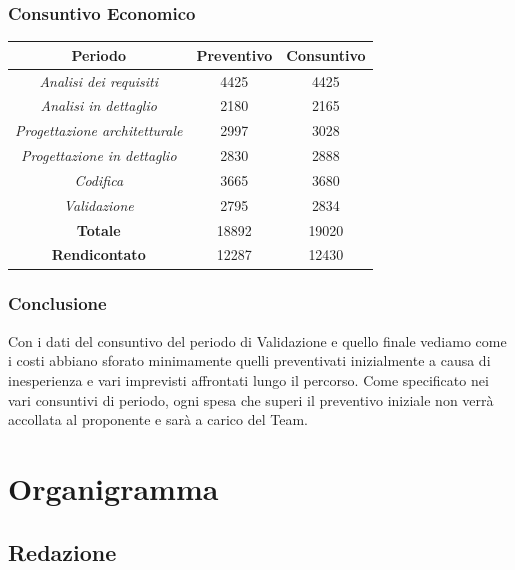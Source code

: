 \subsubsection{Consuntivo Economico}

\begin{center}
	\centering
	\begin{tabular}{|c|c|c|}
		\hline
		\textbf{Periodo} & \textbf{Preventivo} & \textbf{Consuntivo} \\
		\hline	\emph{Analisi dei requisiti}  &4425  &4425 \\
		\hline  \emph{Analisi in dettaglio}  &2180  &2165  \\
		\hline  \emph{Progettazione architetturale}  &2997  &3028  \\
		\hline  \emph{Progettazione in dettaglio}  &2830  &2888  \\
		\hline  \emph{Codifica}  &3665  &3680  \\
		\hline  \emph{Validazione}  &2795  &2834  \\
		\hline
		\textbf{Totale} &18892  &19020  \\
		\hline
		\textbf{Rendicontato} &12287  &12430  \\
		\hline
	\end{tabular}
	
\end{center}

\subsubsection{Conclusione}
Con i dati del consuntivo del periodo di Validazione e quello finale vediamo come i costi abbiano sforato minimamente quelli preventivati inizialmente a causa di inesperienza e vari imprevisti affrontati lungo il percorso.
Come specificato nei vari consuntivi di periodo, ogni spesa che superi il preventivo iniziale non verrà accollata al proponente e sarà a carico del Team.

\clearpage

\appendix
\section{Organigramma}
\subsection{Redazione}

